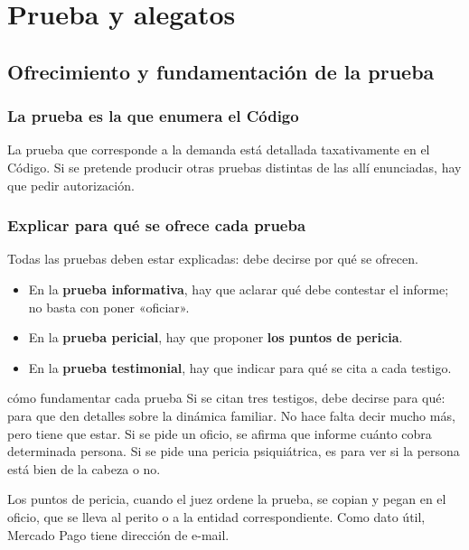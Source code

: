\documentclass[12pt,oneside]{book}
\begin{document}
\chapter[Prueba y alegatos]{Prueba y alegatos}

\section{Ofrecimiento y fundamentación de la prueba}

\subsection{La prueba es la que enumera el Código}

La prueba que corresponde a la demanda está detallada taxativamente en el Código. Si se pretende producir otras pruebas distintas de las allí enunciadas, hay que pedir autorización.

\subsection{Explicar para qué se ofrece cada prueba}

Todas las pruebas deben estar explicadas: debe decirse por qué se ofrecen.

\begin{itemize}
    \item En la \textbf{prueba informativa}, hay que aclarar qué debe contestar el informe; no basta con poner «oficiar».
    \item En la \textbf{prueba pericial}, hay que proponer \textbf{los puntos de pericia}.
    \item En la \textbf{prueba testimonial}, hay que indicar para qué se cita a cada testigo.
\end{itemize}

\begin{example}{cómo fundamentar cada prueba}
Si se citan tres testigos, debe decirse para qué: para que den detalles sobre la dinámica familiar. No hace falta decir mucho más, pero tiene que estar. Si se pide un oficio, se afirma que informe cuánto cobra determinada persona. Si se pide una pericia psiquiátrica, es para ver si la persona está bien de la cabeza o no.
\end{example}

Los puntos de pericia, cuando el juez ordene la prueba, se copian y pegan en el oficio, que se lleva al perito o a la entidad correspondiente. Como dato útil, Mercado Pago tiene dirección de e-mail.
\end{document}
